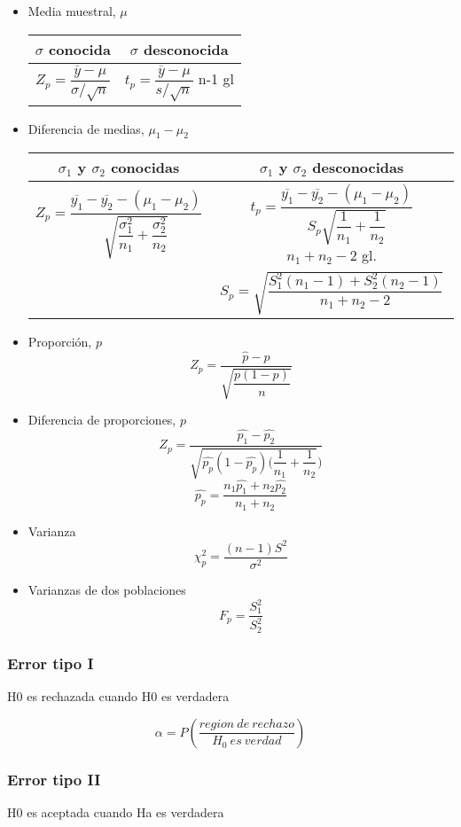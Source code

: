 \begin{itemize}
	\item Media muestral, $\mu$
	
	\begin{tabular}{|c|c|}
		\hline
		$\sigma$ conocida & $\sigma$ desconocida\\
		\hline
		$Z_p=\dfrac{\overline{y}-\mu}{\sigma/\sqrt{n}}$ & $t_p=\dfrac{\overline{y}-\mu}{s/\sqrt{n}}$ n-1 gl\\
		\hline
	\end{tabular}

	\item Diferencia de medias, $\mu_1-\mu_2$
	
	\begin{tabular}{|c|c|}
		\hline
		$\sigma_1$ y $\sigma_2$  conocidas & $\sigma_1$ y $\sigma_2$ desconocidas\\
		\hline
		$Z_p=\dfrac{\overline{y_1}-\overline{y_2}-(\mu_1-\mu_2)}{\sqrt{\dfrac{\sigma_1^2}{n_1}+\dfrac{\sigma_2^2}{n_2}}}$ & $t_p=\dfrac{\overline{y_1}-\overline{y_2}-(\mu_1-\mu_2)}{S_p\sqrt{\dfrac{1}{n_1}+\dfrac{1}{n_2}}}$ $n_1+n_2-2$ gl.\\
		&$S_p=\sqrt{\dfrac{S_1^2(n_1-1)+S_2^2(n_2-1)}{n_1+n_2-2}}$\\
		\hline
	\end{tabular}
	\item Proporción, $p$
	$$Z_p=\dfrac{\hat{p}-p}{\sqrt{\dfrac{p(1-p)}{n}}}$$
	\item Diferencia de proporciones, $p$
	$$Z_p=\dfrac{\hat{p_1}-\hat{p_2}}{\sqrt{\hat{p_p}(1-\hat{p_p})(\dfrac{1}{n_1}+\dfrac{1}{n_2}})}$$
	$$\hat{p_p}=\dfrac{n_1\hat{p_1}+n_2\hat{p_2}}{n_1+n_2}$$
	
	\item Varianza
	$$\chi^2_p=\dfrac{(n-1)S^2}{\sigma^2}$$
	
	\item Varianzas de dos poblaciones
	$$F_p=\dfrac{S_1^2}{S_2^2}$$
\end{itemize}

\subsubsection{Error tipo I}
H0 es rechazada cuando H0 es verdadera

$$\alpha=P\left( \dfrac{region\ de\ rechazo}{H_0\ es\ verdad}\right) $$
\subsubsection{Error tipo II}
H0 es aceptada cuando Ha es verdadera


